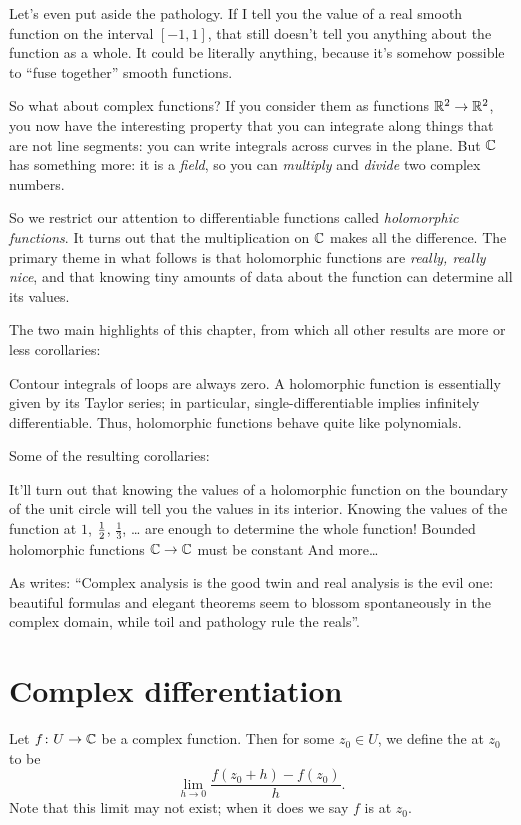 Let's even put aside the pathology.
If I tell you the value of a real smooth function on the interval $[-1, 1]$,
that still doesn't tell you anything about the function as a whole.
It could be literally anything, because it's somehow possible to ``fuse together'' smooth functions.

So what about complex functions?
If you consider them as functions $\mathbb R^2 \to \mathbb R^2$, you now have the interesting property
that you can integrate along things that are not line segments: you can write integrals
across curves in the plane.
But $\mathbb C$ has something more: it is a \emph{field}, so you can \emph{multiply} and \emph{divide} two complex numbers.

So we restrict our attention to differentiable functions called \emph{holomorphic functions}.
It turns out that the multiplication on $\mathbb C$ makes all the difference.
The primary theme in what follows is that holomorphic functions are \emph{really, really nice},
and that knowing tiny amounts of data about the function can determine all its values.

The two main highlights of this chapter,
from which all other results are more or less corollaries:
\begin{itemize}
	\ii Contour integrals of loops are always zero.
	\ii A holomorphic function is essentially given by its Taylor series;
	in particular, single-differentiable implies infinitely differentiable.
	Thus, holomorphic functions behave quite like polynomials.
\end{itemize}
Some of the resulting corollaries:
\begin{itemize}
	\ii It'll turn out that knowing the values of a holomorphic function
	on the boundary of the unit circle will tell you the values in its interior.
	\ii Knowing the values of the function at $1$, $\frac{1}{2}$, $\frac13$, \dots
	are enough to determine the whole function!
	\ii Bounded holomorphic functions $\mathbb C \to \mathbb C$ must be constant
	\ii And more\dots
\end{itemize}

As \cite{ref:pugh} writes: ``Complex analysis is the good twin and real analysis is the evil one: beautiful formulas and elegant theorems seem to blossom spontaneously in the complex domain, while toil and pathology rule the reals''.


\section{Complex differentiation}
Let $f \colon U \to \mathbb C$ be a complex function.
Then for some $z_0 \in U$, we define the  at $z_0$ to be
\[
	\lim_{h \to 0} \frac{f(z_0+h) - f(z_0)}{h}.
\]
Note that this limit may not exist;
when it does we say $f$ is  at $z_0$.

